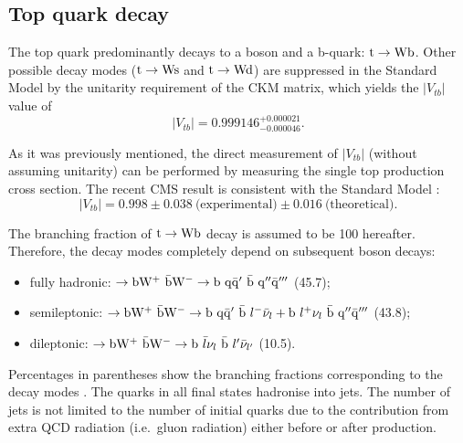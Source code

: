

\subsection{Top quark decay}
\label{ss:top_decay}
The top quark predominantly decays to a \W boson and a b-quark: $\mathrm{t} \rightarrow \mathrm{W} \mathrm{b}$. Other possible decay modes
($\mathrm{t} \rightarrow \mathrm{W} \mathrm{s}$ and $\mathrm{t} \rightarrow \mathrm{W} \mathrm{d}$) are suppressed in the Standard Model by the unitarity
requirement of the CKM matrix, which yields \autocite{PDG} the $|V_{tb}|$ value of
\begin{equation}
|V_{tb}| = 0.999146^{+0.000021}_{-0.000046}.
\end{equation}

As it was previously mentioned, the direct measurement of $|V_{tb}|$ (without assuming unitarity) can be performed by
measuring the single top production cross section. The recent CMS result is consistent with the Standard
Model \autocite{single_top_Vtb_CMS}:
\begin{equation}
|V_{tb}| = 0.998 \pm 0.038~\textrm{(experimental)} \pm 0.016~\textrm{(theoretical)}.
\end{equation}

The branching fraction of $\mathrm{t} \rightarrow \mathrm{W} \mathrm{b}$ decay is assumed to be \SI{100}{\pc} hereafter. Therefore, the
\ttbar decay modes completely depend on subsequent \W boson decays:
\begin{itemize}
  \item fully hadronic: \ttbar $\rightarrow \mathrm{b} \mathrm{W}^+ ~ \bar{\mathrm{b}} \mathrm{W}^- \rightarrow  \mathrm{b}~\mathrm{q}\bar{\mathrm{q}}' ~
  \bar{\mathrm{b}}~\mathrm{q}'' \bar{\mathrm{q}}'''$ (\SI{45.7}{\pc});
  \item semileptonic: \ttbar $\rightarrow \mathrm{b} \mathrm{W}^+ ~ \bar{\mathrm{b}} \mathrm{W}^- \rightarrow \mathrm{b}~\mathrm{q}\bar{\mathrm{q}}' ~ \bar{\mathrm{b}}
  ~ l^- \bar{\nu}_l + \mathrm{b}~l^+ \nu_l ~ \bar{\mathrm{b}}~\mathrm{q}'' \bar{\mathrm{q}}'''$ (\SI{43.8}{\pc});
  \item dileptonic: \ttbar $\rightarrow \mathrm{b} \mathrm{W}^+ ~ \bar{\mathrm{b}} \mathrm{W}^- \rightarrow  \mathrm{b}~\bar{l} \nu_l ~ \bar{\mathrm{b}} ~
  l'\bar{\nu}_{l'}$ (\SI{10.5}{\pc}).
\end{itemize}

Percentages in parentheses show the branching fractions corresponding to the decay modes \autocite{PDG}. The quarks in
all final states hadronise into jets. The number of jets is not limited to the number of initial quarks due to the
contribution from extra QCD radiation (i.e.\ gluon radiation) either before or after \ttbar production.

